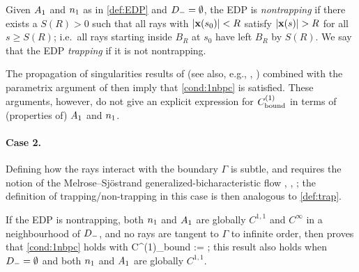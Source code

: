 \begin{definition}\label{def:trap}
Given $A_{1}$ and $n_{1}$ as in \cref{def:EDP} and $D_{-}=\emptyset$, the EDP is \emph{nontrapping} if 
there exists a $S(R)>0$ such that all rays with $|\mathbf{x}(s_0)|<R$ satisfy $|\bx(s)|>R$ for all $s\geq S(R)$; i.e.~all rays starting inside $B_R$ at $s_0$ have left $B_R$ by $S(R)$. 
We say that the EDP \emph{trapping} if it is not nontrapping.
\end{definition}

The propagation of singularities results of \cite[\S VI]{DuHo:72} (see also, e.g., \cite[Chapter 24]{Ho:85}, \cite[\S12.3]{Zw:12}) combined with the parametrix argument of \cite{Va:75} then imply that \cref{cond:1nbpc} is satisfied. These arguments, however, do not give an explicit expression for $C^{(1)}_{\rm bound}$ in terms of (properties of) $A_{1}$ and $n_{1}$.

\paragraph{Case 2.}
Defining how the rays interact with the boundary $\Gamma$ is subtle, and requires the notion of the Melrose--Sj{\"o}strand generalized-bicharacteristic flow 
\cite[\S24.3]{Ho:85}, \cite{MeSj:78}, \cite{MeSj:82}; the definition of trapping/non-trapping in this case \cite[Definition 7.20]{MeSj:82} is then analogous to \cref{def:trap}.

If the EDP is nontrapping, both $n_{1}$ and $A_{1}$ are globally $C^{1,1}$ and $C^\infty$ in a neighbourhood of $D_{-}$, and no rays are tangent to $\Gamma$ to infinite order, 
then \cite[Theorem 2 and Equation 6.32]{GaSpWu:18} proves that \cref{cond:1nbpc} holds with
\beqs
C^{(1)}_{\rm bound} :=   ;
\eeqs
this result also holds when $D_{-}=\emptyset$ and both $n_{1}$ and $A_{1}$ are globally $C^{1,1}$.

